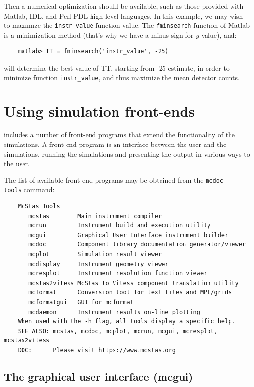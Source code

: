 Then a numerical optimization should be available, such as those provided with Matlab, IDL, and Perl-PDL high level languages. In this example, we may wish to maximize the \verb+instr_value+ function value. The \verb+fminsearch+ function of Matlab is a minimization method (that's why we have a minus sign for $y$ value), and:
\begin{lstlisting}
    matlab> TT = fminsearch('instr_value', -25)
\end{lstlisting}
will determine the best value of TT, starting from -25 estimate, in order to
minimize function \verb+instr_value+, and thus maximize the mean detector
counts.

\section{Using simulation front-ends}
\label{s:frontends}

\MCS includes a number of front-end programs that extend the
functionality of the simulations. A front-end program is an interface
between the user and the simulations, running the simulations and
presenting the output in various ways to the user.

The list of available \MCS front-end programs may be obtained from the
\verb+mcdoc --tools+ command:
\begin{lstlisting}
    McStas Tools
       mcstas        Main instrument compiler
       mcrun         Instrument build and execution utility
       mcgui         Graphical User Interface instrument builder
       mcdoc         Component library documentation generator/viewer
       mcplot        Simulation result viewer
       mcdisplay     Instrument geometry viewer
       mcresplot     Instrument resolution function viewer
       mcstas2vitess McStas to Vitess component translation utility
       mcformat      Conversion tool for text files and MPI/grids
       mcformatgui   GUI for mcformat
       mcdaemon      Instrument results on-line plotting
    When used with the -h flag, all tools display a specific help.
    SEE ALSO: mcstas, mcdoc, mcplot, mcrun, mcgui, mcresplot, mcstas2vitess
    DOC:      Please visit https://www.mcstas.org
\end{lstlisting}

\subsection{The graphical user interface (mcgui)}
\label{s:mcgui}

